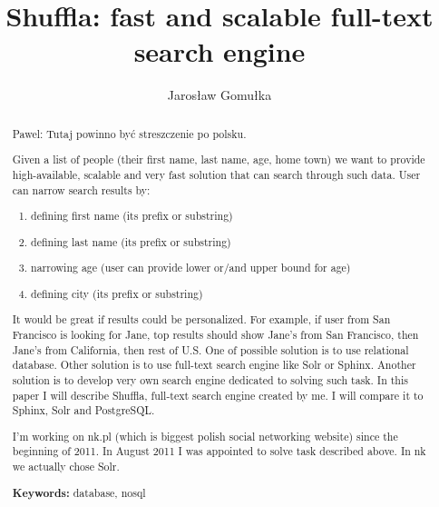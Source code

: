 \documentclass[10pt,a4paper]{article}
\newcommand{\pawel}[1]{\noindent\colorbox{myRed}{Pawel: #1}}
\begin{document}
\normalsize

\restoregeometry

\newpage
\thispagestyle{empty}

\begin{abstract}
\pawel{Tutaj powinno być streszczenie po polsku.}
\end{abstract}



\title{Shuffla: fast and scalable full-text search engine}
\author{Jarosław Gomułka}

\maketitle

\begin{abstract}
Given a list of people (their first name, last name, age, home town) we want to provide high-available, scalable and very fast solution that can search through such data.
User can narrow search results by:

\bigskip
\begin{enumerate}
\item{defining first name (its prefix or substring)}
\item{defining last name (its prefix or substring)}
\item{narrowing age (user can provide lower or/and upper bound for age)}
\item{defining city (its prefix or substring)}
\end{enumerate}

\bigskip
It would be great if results could be personalized. For example, if user from San Francisco is looking for Jane, top results should show Jane's from San Francisco, then Jane's from California, then rest of U.S. One of possible solution is to use relational database. Other solution is to use full-text search engine like Solr or Sphinx. Another solution is to develop very own search engine dedicated to solving such task. In this paper I will describe Shuffla, full-text search engine created by me. I will compare it to Sphinx, Solr and PostgreSQL. 

\bigskip
I'm working on nk.pl (which is biggest polish social networking website) since the beginning of 2011. In August 2011 I was appointed to solve task described above. In nk we actually chose Solr.

\bigskip
\noindent \textbf{Keywords:} database, nosql
\end{abstract}
\end{document}
